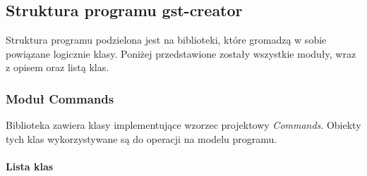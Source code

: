 \documentclass[12pt]{article}
\begin{document}
\subsection{Struktura programu gst-creator}
Struktura programu podzielona jest na biblioteki, które gromadzą w sobie powiązane logicznie klasy. Poniżej przedstawione zostały wszystkie moduły, wraz z opisem oraz listą klas.
\subsubsection{Moduł Commands}
Biblioteka zawiera klasy implementujące wzorzec projektowy \textit{Commands}. Obiekty tych klas wykorzystywane są do operacji na modelu programu.
\paragraph{}
\textbf{Lista klas}
\vspace{-2mm}
\end{document}
